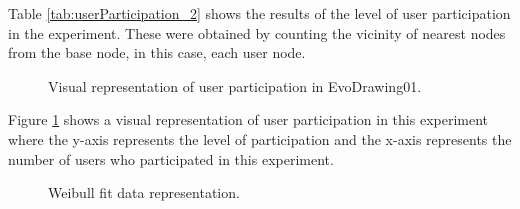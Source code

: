 Table \ref{tab:userParticipation_2} shows the results of the level of user
participation in the experiment. These were obtained by counting the vicinity of
nearest nodes from the base node, in this case, each user node.


\begin{figure}
\centering
{} %
\caption{Visual representation of user participation in EvoDrawing01.}
\label{fig:userP_2}
\end{figure}


Figure \ref{fig:userP_2} shows a visual representation of user
participation in this experiment where the y-axis represents the level of
participation and the x-axis represents the number of users who participated in
this experiment.

\begin{figure}
\centering
{} %
\caption{Weibull fit data representation.}
\label{fig:weibull_2}
\end{figure}


